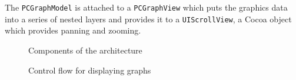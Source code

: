 The \texttt{PCGraphModel} is attached to a \texttt{PCGraphView} which puts the
graphics data into a series of nested layers and provides it to a
\texttt{UIScrollView}, a Cocoa object which provides panning and zooming.

\onecolumn

\begin{figure}[p]
    \caption{\label{fig:maw_components} Components of the architecture}
\end{figure}

\begin{figure}[htbp]
    \caption{\label{fig:maw_controlflow} Control flow for displaying graphs}
\end{figure}

